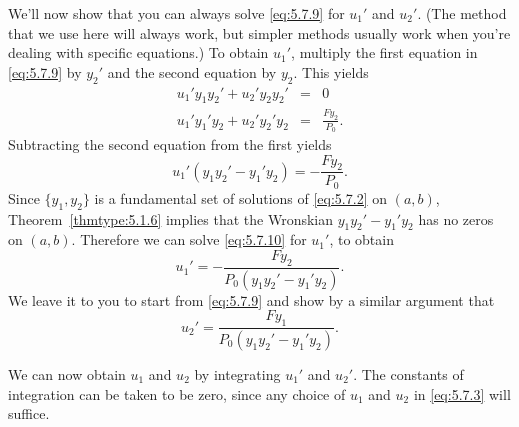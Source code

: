 We'll now show that you can always solve \eqref{eq:5.7.9} for $u_{1}'$ and $u_{2}'$. (The method
that we use here will always work, but simpler methods usually work when you're dealing with
specific equations.) To obtain $u_{1}'$, multiply the first equation in \eqref{eq:5.7.9} by $y_{2}'$
and the second equation by $y_{2}$. This yields
\begin{eqnarray*}
  u_{1}'y_{1}y_{2}'+u_{2}'y_{2}y_{2}' & = & 0 \\
  u_{1}'y_{1}'y_{2}+u_{2}'y_{2}'y_{2} & = & \frac{Fy_{2}}{P_{0}}.
\end{eqnarray*}
Subtracting the second equation from the first yields
\begin{equation}
  \label{eq:5.7.10}u_{1}'(y_{1}y_{2}'-y_{1}'y_{2})=-\frac{Fy_{2}}{P_{0}}.
\end{equation}
Since $\{y_{1},y_{2}\}$ is a fundamental set of solutions of \eqref{eq:5.7.2} on $(a,b)$,
Theorem~\ref{thmtype:5.1.6} implies that the Wronskian $y_{1}y_{2}'-y_{1}'y_{2}$ has no zeros on
$(a,b)$. Therefore we can solve \eqref{eq:5.7.10} for $u_{1}'$, to obtain
\begin{equation}
  \label{eq:5.7.11}u_{1}'=-\frac{Fy_{2}}{P_{0}(y_{1}y_{2}'-y_{1}'y_{2})}.
\end{equation}
We leave it to you to start from \eqref{eq:5.7.9} and show by a similar argument that
\begin{equation}
  \label{eq:5.7.12}u_{2}'=\frac{Fy_{1}}{P_{0}(y_{1}y_{2}'-y_{1}'y_{2})}.
\end{equation}

We can now obtain $u_{1}$ and $u_{2}$ by integrating $u_{1}'$ and $u_{2}'$. The constants of
integration can be taken to be zero, since any choice of $u_{1}$ and $u_{2}$ in \eqref{eq:5.7.3}
will suffice.

